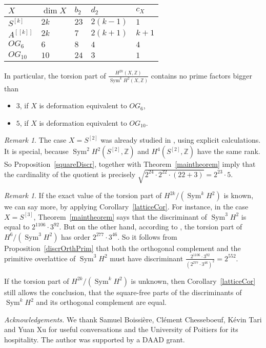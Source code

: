 \documentclass{amsart}
\DeclareMathOperator{\Sym}{Sym}
\newcommand{\Z}{\mathbb{Z}}
\theoremstyle{plain}
\theoremstyle{definition}
\theoremstyle{remark}
\newtheorem{remark}[theorem]{Remark}
\begin{document}
\begin{center}
\begin{tabular}{ p{2cm} p{2cm} p{2cm} p{2cm} p{2cm} }
$X$ 		& $\dim X$	& $b_2$ & $d_2$	& $c_X$ \\ \hline 
$S^{[k]}$ 	& $2k$ 		& $23$ 	& $ 2(k-1)$		& $1$	\\
$A^{[[k]]}$	& $2k$ 		& $7$	& $ 2(k+1)$		& $k+1$ \\
$OG_6$		& $6$		& $8$	& $4$			& $4$ 	\\
$OG_{10}$	& $10$		& $24$	& $3$			& $1$ 	
\end{tabular}
\end{center}
In particular, the torsion part of $\frac{H^{2k}(X,\Z)}{\Sym^kH^2(X,\Z)}$ contains no prime factors bigger than
\begin{itemize}
\item $3$, if $X$ is deformation equivalent to $OG_6$,
\item $5$, if $X$ is deformation equivalent to $OG_{10}$.
\end{itemize} 
\begin{remark}
The case $X=S^{[2]}$ was already studied in \cite[Prop.~6.6]{BNS}, using explicit calculations. It is special, because $\Sym^2H^2(S^{[2]},\Z)$ and $H^4(S^{[2]},\Z)$ have the same rank. So Proposition~\ref{squareDiscr}, together with Theorem~\ref{maintheorem} imply that the cardinality of the quotient is precisely $\sqrt{2^{24}\cdot2^{22}\cdot(22+3)} = 2^{23}\cdot5$.
\end{remark}
\begin{remark}
If the exact value of the torsion part of $H^{2k}/(\Sym^kH^2)$ is known, we can say more, by applying Corollary~\ref{latticeCor}. For instance,
in the case $X=S^{[3]}$, Theorem~\ref{maintheorem} says that the discriminant of $\Sym^3H^2$ is equal to $2^{1106}\cdot 3^{92}$. But on the other hand, according to \cite[Prop.~2.4]{Kapfer}, the torsion part of $H^6/(\Sym^3H^2)$ has order $2^{277}\cdot 3^{46}$. So it follows from Proposition~\ref{discrOrthPrim} that both the orthogonal complement and the primitive overlattice of $\Sym^3H^2$ must have discriminant $\frac{2^{1106}\cdot 3^{92}}{(2^{277}\cdot 3^{46})^2}=2^{552}$.

If the torsion part of $H^{2k}/(\Sym^kH^2)$ is unknown, then Corollary~\ref{latticeCor} still allows the conclusion, that the square-free parts of the discriminants of $\Sym^kH^2$ and its orthogonal complement are equal.
\end{remark}



\emph{Acknowledgements.} We thank Samuel Boissi\`ere, Cl\'ement Chesseboeuf, K\'evin Tari and Yuan Xu for useful conversations and the University of Poitiers for its hospitality. The author was supported by a DAAD grant.



\end{document}
